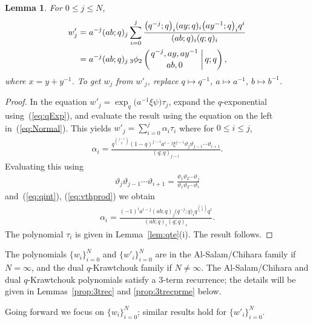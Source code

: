 \documentclass[pdftex]{sigma}
\numberwithin{equation}{section}
\newtheorem{Lemma}[Theorem]{Lemma}
\begin{document}
\begin{Lemma}\label{lem:wjhyper} For $0 \leq j \leq N$,
\begin{align*}
w'_j &= a^{-j} (ab;q)_j \sum_{i=0}^j
\frac{
\big(q^{-j};q\big)_i
(ay;q)_i
\big(ay^{-1};q\big)_i q^i}
{
(ab;q)_i
(q;q)_i
}
\\
 &= a^{-j} (ab;q)_j\,
 {}_3\phi_2 \left(
 \genfrac{}{}{0pt}{}
 {q^{-j}, ay, ay^{-1} }
 {ab, 0}
 \,\bigg\vert \, q; q \right),
\end{align*}
where $x=y+y^{-1}$.
To get $w_j$ from $w'_j$, replace
$q \mapsto q^{-1}$,
$a\mapsto a^{-1}$,
$b\mapsto b^{-1}$.
\end{Lemma}
\begin{proof}In the equation
$w'_j = \exp_q\big(a^{-1} \xi \psi \big) \tau_j$,
expand the $q$-exponential using~(\ref{eq:qExp}), and evaluate the result using
the equation on the left in~(\ref{eq:Normal}). This yields
$w'_j = \sum_{i=0}^j \alpha_i \tau_i$ where for $0 \leq i \leq j$,
\begin{gather*}
\alpha_i = \frac{q^{\binom{j-i}{2}} (1-q)^{j-i} a^{i-j} \xi^{j-i}
\vartheta_j \vartheta_{j-1} \cdots \vartheta_{i+1}
}{(q;q)_{j-i}}.
\end{gather*}
Evaluating this using
\begin{gather*}
\vartheta_j \vartheta_{j-1} \cdots \vartheta_{i+1} =
\frac{
\vartheta_1 \vartheta_{2} \cdots \vartheta_{j}}
{
\vartheta_1 \vartheta_{2} \cdots \vartheta_{i}}
\end{gather*}
and~(\ref{eq:qint}),
(\ref{eq:vthprod}) we obtain
\begin{gather*}
\alpha_i = \frac{(-1)^i a^{i-j} (ab;q)_j \big(q^{-j};q\big)_i q^{\binom{i}{2}} q^i} {(ab;q)_i (q;q)_i}.
\end{gather*}
The polynomial $\tau_i$ is given in Lemma~\ref{lem:qte}(i). The result follows.
\end{proof}

\begin{Note}\label{note:3trec}
The polynomials $\lbrace w_i \rbrace_{i=0}^N$ and
$\lbrace w'_i \rbrace_{i=0}^N$ are in the
Al-Salam/Chihara family
\cite[Section~14.8]{koekoek}
if $N=\infty$,
 and the
dual $q$-Krawtchouk family \cite[Section~14.17]{koekoek}
if $N\not=\infty$. The Al-Salam/Chihara and dual $q$-Krawtchouk
polynomials satisfy a 3-term recurrence; the details will be
given in Lemmas~\ref{prop:3trec} and \ref{prop:3trecprme} below.
\end{Note}

Going forward we focus on $\lbrace w_i \rbrace_{i=0}^N$;
similar results hold for $\lbrace w'_i \rbrace_{i=0}^N$.
\end{document}
